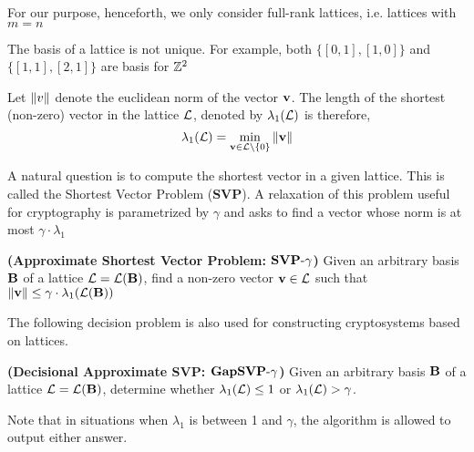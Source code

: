 \noindent For our purpose, henceforth, we only consider full-rank lattices, i.e. lattices with $m = n$

\begin{remark}
The basis of a lattice is not unique. For example, both $ \{ [0,1],[1,0] \}$ and $\{[1,1], [2,1] \}$ are basis for ${{\mathbb Z}}^2$
\end{remark}

\noindent Let $\|v\|$ denote the euclidean norm of the vector $\mathbf{v}$. The length of the shortest (non-zero) vector in the lattice $\mathcal{L}$, denoted by $\lambda_1(\mathcal{L})$ is therefore,
\[\lambda_1(\mathcal{L}) = \min_{\mathbf{v} \in \mathcal{L} \setminus \{0\}} \|\mathbf{v}\|
\]

\noindent A natural question is to compute the shortest vector in a given lattice. This is called the Shortest Vector Problem (\textbf{SVP}). A relaxation of this problem useful for cryptography is parametrized by $\gamma$ and asks to find a vector whose norm is at most $\gamma \cdot \lambda_1$

\begin{problem} 
\textnormal{\textbf{(Approximate Shortest Vector Problem: $\textbf{SVP}\textnormal{-}\gamma$)}}
Given an arbitrary basis $\mathbf{B}$ of a lattice $\mathcal{L} = \mathcal{L}(\mathbf{B})$, find a non-zero vector $\mathbf{v} \in \mathcal{L}$ such that $\|\mathbf{v}\| \leq \gamma \cdot \lambda_1(\mathcal{L}(\mathbf{B}))$
\end{problem}


\noindent The following decision problem is also used for constructing cryptosystems based on lattices.

\begin{problem}
\textnormal{\textbf{(Decisional Approximate SVP: $\textbf{GapSVP}\textnormal{-}\gamma$)}}
Given an arbitrary basis $\mathbf{B}$ of a lattice $\mathcal{L} = \mathcal{L}(\mathbf{B})$, determine whether $\lambda_1(\mathcal{L}) \leq 1$ or $\lambda_1(\mathcal{L}) > \gamma$. 

\noindent Note that in situations when $\lambda_1$ is between 1 and $\gamma$, the algorithm is allowed to output either answer. 
\end{problem}

